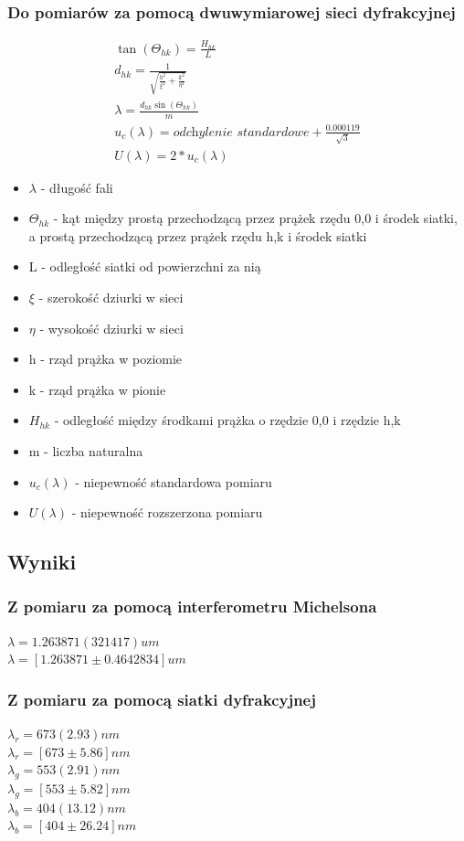 \documentclass{article}
\begin{document}
\subsubsection{Do pomiarów za pomocą dwuwymiarowej sieci dyfrakcyjnej}
\begin{gather*}
    \tan(\Theta_{hk}) = \frac{H_{hk}}{L} \\
    d_{hk} = \frac{1}{\sqrt{\frac{h^2}{\xi^2}+\frac{k^2}{\eta^2}}} \\
    \lambda = \frac{d_{hk}\sin(\Theta_{hk})}{m} \\
    u_{c}(\lambda) = \textit{odchylenie standardowe} + \frac{0.000119}{\sqrt{3}} \\
    U(\lambda) = 2 * u_{c}(\lambda) 
\end{gather*}
\begin{itemize}
    \item $\lambda$ - długość fali
    \item $\Theta_{hk}$ -  kąt między prostą przechodzącą przez prążek rzędu 0,0 i środek siatki, a prostą przechodzącą przez prążek rzędu h,k i środek siatki
    \item L - odległość siatki od powierzchni za nią
    \item $\xi$ - szerokość dziurki w sieci
    \item $\eta$ - wysokość dziurki w sieci
    \item h - rząd prążka w poziomie
    \item k - rząd prążka w pionie
    \item $H_{hk}$ - odległość między środkami prążka o rzędzie 0,0 i rzędzie h,k
    \item m - liczba naturalna
    \item $u_{c}(\lambda)$ - niepewność standardowa pomiaru
    \item $U(\lambda)$ - niepewność rozszerzona pomiaru
\end{itemize}


\subsection{Wyniki}
\subsubsection{Z pomiaru za pomocą interferometru Michelsona}
$\lambda = 1.263871(321417) um $ \\
$\lambda = [1.263871 \pm 0.4642834] um $
\subsubsection{Z pomiaru za pomocą siatki dyfrakcyjnej}
$\lambda_r=673(2.93)nm$\\
$\lambda_r=[673\pm5.86]nm$\\
$\lambda_g=553(2.91)nm$\\
$\lambda_g=[553\pm5.82]nm$\\
$\lambda_b=404(13.12)nm$\\
$\lambda_b=[404\pm26.24]nm$
\end{document}
